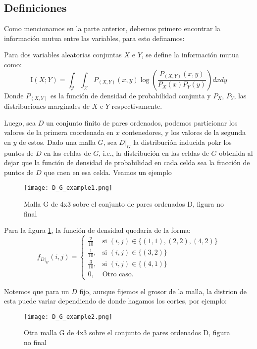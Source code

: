 \subsection{Definiciones}

	Como mencionamos en la parte anterior, debemos primero encontrar la informaci\'on mutua entre las variables, para esto definamos:

	\begin{defn}
		Para dos variables aleatorias conjuntas $X$ e $Y$, se define la informaci\'on mutua como:
		$$
		\mathrm{I}(X ; Y)=\int_{\mathcal{Y}} \int_{\mathcal{X}} P_{(X, Y)}(x, y) \log \left(\frac{P_{(X, Y)}(x, y)}{P_{X}(x) P_{Y}(y)}\right)dxdy
		$$
		Donde $P_{(X, Y)}$ es la funci\'on de densidad de probabilidad conjunta y $P_{X}$, $P_{Y}$, las distribuciones marginales de $X$ e $Y$ respectivamente. 
	\end{defn}

	Luego, sea $D$ un conjunto finito de pares ordenados, podemos particionar los valores de la primera coordenada en $x$ contenedores, y los valores de la segunda en $y$ de estos. Dado una malla $G$, sea $D|_G$ la distribuci\'on inducida pokr los puntos de $D$ en las celdas de $G$, i.e., la distribuci\'on en las celdas de $G$ obtenida al dejar que la funci\'on de densidad de probabilidad en cada celda sea la fracci\'on de puntos de $D$ que caen en esa celda. Veamos un ejemplo
	\begin{figure}[H]
		\centering
		\texttt{[image: D\_G\_example1.png]}
		\caption{Malla G de 4x3 sobre el conjunto de pares ordenados D, figura no final}
		\label{malla_G}
	\end{figure}

	Para la figura \ref{malla_G}, la funci\'on de densidad quedar\'ia de la forma:
	\[
		f_{D|_G}(i,j) = \left\{\begin{array}{lr}
			\frac{2}{10} & \text{si } (i,j) \in \{ (1,1), (2,2), (4,2)\} \\
			\frac{1}{10}, & \text{si }(i,j) \in \{ (3,2)\}  \\
			\frac{3}{10}, & \text{si }(i,j) \in \{ (4,1)\}  \\
			0, & \text{Otro caso.}
			\end{array}\right.
	\]



	Notemos que para un $D$ fijo, aunque fijemos el grosor de la malla, la distrion de esta puede variar dependiendo de donde hagamos los cortes, por ejemplo:

	\begin{figure}[H]
		\centering
		\texttt{[image: D\_G\_example2.png]}
		\caption{Otra malla G de 4x3 sobre el conjunto de pares ordenados D, figura no final}
		\label{malla_G_2}
	\end{figure}

